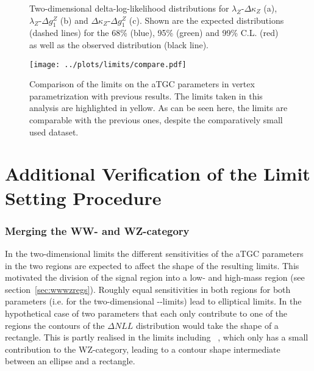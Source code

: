 \begin{figure}
	\centering
	\caption[Two-dimensional delta-log-likelihood distributions for the three combinations of aTGC parameters in the vertex parametrization]{Two-dimensional delta-log-likelihood distributions for $\lambda_Z$-$\Delta\kappa_Z$ (a), $\lambda_Z$-$\Delta g_1^Z$ (b) and $\Delta\kappa_Z$-$\Delta g_1^Z$ (c). Shown are the expected distributions (dashed lines) for the 68\% (blue), 95\% (green) and 99\% C.L. (red) as well as the observed distribution (black line).}
	\label{fig:limits:2dlimitsvertex}	
\end{figure}

\begin{figure}
    \centering
    \texttt{[image: ../plots/limits/compare.pdf]}
    \caption[Comparison of the limits on the aTGC parameters in vertex parametrization with previous results]{Comparison of the limits on the aTGC parameters in vertex parametrization with previous results. The limits taken in this analysis are highlighted in yellow. As can be seen here, the limits are comparable with the previous ones, despite the comparatively small used dataset.}
\end{figure}

\section{Additional Verification of the Limit Setting Procedure}
\label{sec:limits:atgcint}
\subsubsection*{Merging the WW- and WZ-category}

In the two-dimensional limits the different sensitivities of the aTGC parameters in the two regions are expected to affect the shape of the resulting limits. This motivated the division of the signal region into a low- and high-mass region (see section~\ref{sec:wwwzregs}). Roughly equal sensitivities in both regions for both parameters (i.e. for the two-dimensional \Tcwww -\Tccw -limits) lead to elliptical limits. In the hypothetical case of two parameters that each only contribute to one of the regions the contours of the $\Delta NLL$ distribution would take the shape of a rectangle. This is partly realised in the limits including \Tcb \ , which only has a small contribution to the WZ-category, leading to a contour shape intermediate between an ellipse and a rectangle.\\

